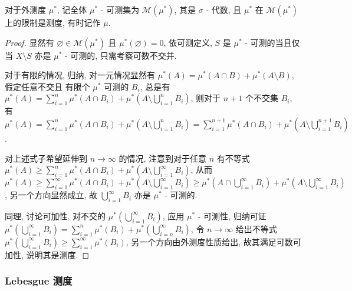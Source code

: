 \begin{definition}
    对于外测度 \(\mu^\ast\), 记全体 \(\mu^\ast\) - 可测集为 \(\mathcal{M} (\mu^\ast)\), 其是 \(\sigma\) - 代数,
    且 \(\mu^\ast\) 在 \(\mathcal{M} (\mu^\ast)\) 上的限制是测度, 有时记作 \(\mu\).

    \begin{proof}
        显然有 \(\varnothing \in \mathcal{M} (\mu^\ast)\) 且 \(\mu^\ast (\varnothing) = 0\),
        依可测定义, \(S\) 是 \(\mu^\ast\) - 可测的当且仅当 \(X \setminus S\) 亦是 \(\mu^\ast\) - 可测的, 只需考察可数不交并.

        对于有限的情况, 归纳, 对一元情况显然有 \(\mu^\ast(A) = \mu^\ast(A \cap B) + \mu^\ast(A \setminus B)\), 假定任意不交且 
        有限个 \(\mu^\ast\) 可测的 \(B_i\), 总是有 \(\mu^\ast(A) = \sum_{i=1}^{n} \mu^\ast (A \cap B_i) + \mu^\ast (A \setminus \bigcup_{i=1}^{n} B_i)\),
        则对于 \(n+1\) 个不交集 \(B_i\), 有 \(\mu^\ast(A) = \sum_{i=1}^{n} \mu^\ast (A \cap B_i) + \mu^\ast (A \setminus \bigcup_{i=1}^{n} B_i) = \sum_{i=1}^{n+1} \mu^\ast (A \cap B_i) + \mu^\ast (A \setminus \bigcup_{i=1}^{n+1} B_i)\).

        对上述式子希望延伸到 \(n \to \infty\) 的情况, 注意到对于任意 \(n\) 有不等式 \(\mu^\ast(A) \geq \sum_{i=1}^{n} \mu^\ast (A \cap B_i) + \mu^\ast (A \setminus \bigcup_{i=1}^{\infty} B_i)\),
        从而 \(\mu^\ast(A) \geq \sum_{i=1}^{\infty} \mu^\ast (A \cap B_i) + \mu^\ast (A \setminus \bigcup_{i=1}^{\infty} B_i) \geq \mu^\ast(A \cap \bigcup_{i=1}^{\infty} B_i) + \mu^\ast (A \setminus \bigcup_{i=1}^{\infty} B_i)\),
        另一个方向显然成立, 故 \(\bigcup_{i=1}^{\infty} B_i\) 亦是 \(\mu^\ast\) - 可测的.

        同理, 讨论可加性, 对不交的 \(\mu^\ast(\bigcup_{i=1}^\infty B_i)\), 应用 \(\mu^\ast\) - 可测性,
        归纳可证 \(\mu^\ast (\bigcup_{i=1}^{\infty} B_i) = \sum_{i=1}^{n} \mu^\ast (B_i) + \mu^\ast (\bigcup_{i=n}^{\infty} B_i)\),
        令 \(n \to \infty\) 给出不等式 \(\mu^\ast (\bigcup_{i=1}^{\infty} B_i) \geq \sum_{i=1}^{\infty} \mu^\ast (B_i)\),
        另一个方向由外测度性质给出, 故其满足可数可加性, 说明其是测度.
    \end{proof}
\end{definition}

\subsubsection{Lebesgue 测度}

